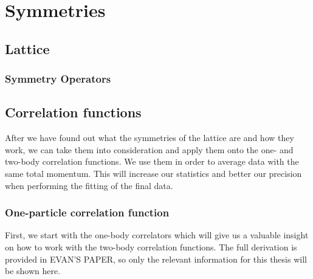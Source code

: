 
\chapter{Symmetries}
\label{sec:symmetries}

\section{Lattice}
\subsection{Symmetry Operators}

\section{Correlation functions}

After we have found out what the symmetries of the lattice are and how they work, we can take them into consideration and apply them onto the one- and two-body correlation functions. We use them in order to average data with the same total momentum. This will increase our statistics and better our precision when performing the fitting of the final data.

\subsection{One-particle correlation function}

First, we start with the one-body correlators which will give us a valuable insight on how to work with the two-body correlation functions. The full derivation is provided in EVAN'S PAPER, so only the relevant information for this thesis will be shown here.

